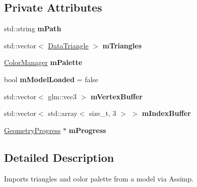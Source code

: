 \subsection*{Private Attributes}
\begin{DoxyCompactItemize}
\item 
\mbox{\label{classpepr3d_1_1_model_importer_a246ce191de19d1ab72551c935012405c}} 
std\+::string {\bfseries m\+Path}
\item 
\mbox{\label{classpepr3d_1_1_model_importer_a4e1963a18c5ac3d49837b37198fb1f07}} 
std\+::vector$<$ \mbox{\hyperlink{classpepr3d_1_1_data_triangle}{Data\+Triangle}} $>$ {\bfseries m\+Triangles}
\item 
\mbox{\label{classpepr3d_1_1_model_importer_a0c75d881e5a8995f9d868d3648f99fed}} 
\mbox{\hyperlink{classpepr3d_1_1_color_manager}{Color\+Manager}} {\bfseries m\+Palette}
\item 
\mbox{\label{classpepr3d_1_1_model_importer_a4b325d259c20fa610a3c37505e07ed9b}} 
bool {\bfseries m\+Model\+Loaded} = false
\item 
\mbox{\label{classpepr3d_1_1_model_importer_a783426cd94762a3c47b208bd93131056}} 
std\+::vector$<$ glm\+::vec3 $>$ {\bfseries m\+Vertex\+Buffer}
\item 
\mbox{\label{classpepr3d_1_1_model_importer_a1f8ebea24ac6768d0aa19e35b9378511}} 
std\+::vector$<$ std\+::array$<$ size\+\_\+t, 3 $>$ $>$ {\bfseries m\+Index\+Buffer}
\item 
\mbox{\label{classpepr3d_1_1_model_importer_a15f30eb03ee6489b372b4ca2ca2dc9de}} 
\mbox{\hyperlink{structpepr3d_1_1_geometry_progress}{Geometry\+Progress}} $\ast$ {\bfseries m\+Progress}
\end{DoxyCompactItemize}


\subsection{Detailed Description}
Imports triangles and color palette from a model via Assimp. 


